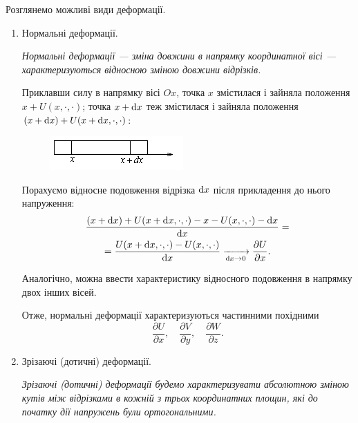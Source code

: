 Розглянемо можливі види деформації.
\begin{enumerate}
	\item Нормальні деформації. \smallskip

	\begin{definition}
		\it{Нормальні деформації} --- зміна довжини в напрямку координатної вісі --- характеризуються відносною зміною довжини відрізків.
	\end{definition}

	Приклавши силу в напрямку вісі $Ox$, точка $x$ змістилася і зайняла положення $x + U(x, \cdot, \cdot)$; точка $x + \mathop{}\!\mathrm{d} x$ теж змістилася і зайняла положення $(x + \mathop{}\!\mathrm{d} x) + U(x + \mathop{}\!\mathrm{d} x, \cdot, \cdot)$:
	\begin{figure}[H]
		\centering
		\includegraphics[]{img/8-3.png}
	\end{figure}

	Порахуємо відносне подовження відрізка $\mathop{}\!\mathrm{d} x$ після прикладення до нього напруження:
	\begin{multline}
		\frac{(x + \mathop{}\!\mathrm{d} x) + U(x + \mathop{}\!\mathrm{d} x, \cdot, \cdot) - x - U(x, \cdot, \cdot) - \mathop{}\!\mathrm{d} x}{\mathop{}\!\mathrm{d} x} = \\
		= \frac{U(x + \mathop{}\!\mathrm{d} x, \cdot, \cdot) - U(x, \cdot, \cdot)}{\mathop{}\!\mathrm{d} x} \xrightarrow[\mathop{}\!\mathrm{d} x \to 0]{} \frac{\partial U}{\partial x}.
	\end{multline}

	Аналогічно, можна ввести характеристику відносного подовження в напрямку двох інших вісей. \medskip

	Отже, нормальні деформації характеризуються частинними похідними
	\begin{equation}
		\frac{\partial U}{\partial x}, \quad \frac{\partial V}{\partial y}, \quad \frac{\partial W}{\partial z}.
	\end{equation}

	\item Зрізаючі (дотичні) деформації. \smallskip

	\begin{definition} 
		\it{Зрізаючі (дотичні) деформації} будемо характеризувати абсолютною зміною кутів між відрізками в кожній з трьох координатних площин, які до початку дії напружень були ортогональними.
	\end{definition}


\end{enumerate}
